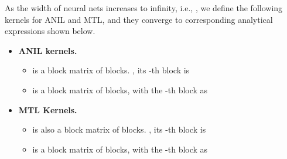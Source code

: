 \documentclass{article}
\begin{document}
\begin{lemma}\label{lemma:anil-mtl-kernels} As the width of neural nets increases to infinity, i.e., , we define the following kernels for ANIL and MTL, and they converge to corresponding analytical expressions shown below.
\begin{itemize}
    \item \textbf{ANIL kernels.} 
    \begin{itemize}
        \item  is a block matrix of  blocks. , its -th block is
    
        \item  is a block matrix of  blocks, with the -th block as 
    
    \end{itemize}
    \item \textbf{MTL Kernels.} 
    \begin{itemize}
        \item  is also a block matrix of  blocks. , its -th block is
    
        \item  is a block matrix of  blocks, with the -th block as
    
    \end{itemize}    
\end{itemize}
\end{lemma}
\end{document}
